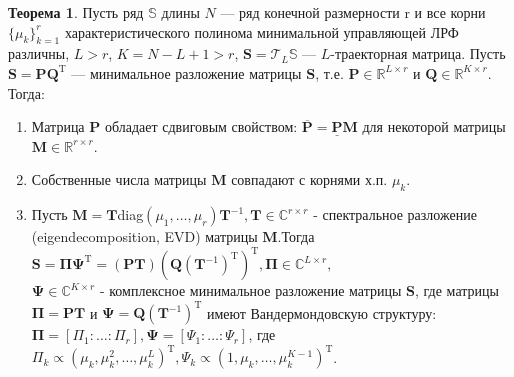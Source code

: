 \documentclass[specialist,
               substylefile = spbu_report.rtx,
               subf,href,colorlinks=true, 12pt]{disser}
\theoremstyle{definition}
\newtheorem{theorem}{Теорема}
\begin{document}
\begin{theorem}
Пусть ряд $\mathbb{S}$ длины $N$ — ряд конечной размерности r и все
корни $\{ \mu_k\}_{k=1}^r$ характеристического полинома минимальной управляющей ЛРФ различны, $L > r$, $K = N - L + 1 > r$, $\mathbf{S} = \mathcal{T}_L\mathbb{S}$ — $L$-траекторная матрица. Пусть $\mathbf{S} = \mathbf{PQ}^{\mathrm{T}}$ — минимальное разложение матрицы $\mathbf{S}$, т.е. $\mathbf{P} \in \mathbb{R}^{L \times r}$ и $\mathbf{Q} \in \mathbb{R}^{K \times r}$. \\
    \hspace*{0.5cm} Тогда:
    \begin{enumerate}
        \item Матрица $\mathbf{P}$ обладает сдвиговым свойством: $\overline{\mathbf{P}} = \underline{\mathbf{P}}\mathbf{M}$ для некоторой матрицы $\mathbf{M} \in \mathbb{R}^{r \times r}$.
        \item Собственные числа матрицы $\mathbf{M}$ совпадают с корнями х.п. $\mu_k$.
        \item Пусть $\mathbf{M} = \mathbf{T}$diag$(\mu_1,\dots,\mu_r)\mathbf{T}^{-1}, \mathbf{T} \in \mathbb{C}^{r \times r}$ - спектральное разложение (eigen\-decomposition, EVD) матрицы $\mathbf{M}$.Тогда $\mathbf{S} = \mathbf{\Pi\Psi}^{\mathrm{T}} = (\mathbf{PT})(\mathbf{Q}(\mathbf{T}^{-1})^{\mathrm{T}})^{\mathrm{T}}, \mathbf{\Pi} \in \mathbb{C}^{L \times r}, $\\$\mathbf{\Psi} \in \mathbb{C}^{K \times r}$ - комплексное минимальное разложение матрицы $\mathbf{S}$, где матрицы $\mathbf{\Pi} = \mathbf{PT}$ и $\mathbf{\Psi} = \mathbf{Q}(\mathbf{T}^{-1})^{\mathrm{T}}$ имеют Вандермондовскую структуру: $\mathbf{\Pi} = [\Pi_1: \ldots :\Pi_r], \mathbf{\Psi} = [\Psi_1: \ldots :\Psi_r]$, где $\Pi_k \propto(\mu_k,\mu_k^2, \dots, \mu_k^L)^{\mathrm{T}}, \Psi_k \propto(1,\mu_k, \dots, \mu_k^{K - 1})^{\mathrm{T}}$.
    \end{enumerate}

\end{theorem}
\end{document}
